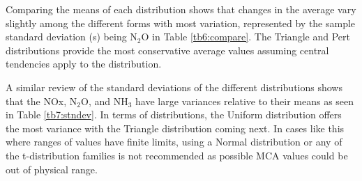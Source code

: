 %
Comparing the means of each distribution shows that changes in the average vary slightly among the different forms with most variation, represented by the sample standard deviation (s) being N$_{2}$O in Table \ref{tb6:compare}.  The Triangle and Pert distributions provide the most conservative average values assuming central tendencies apply to the distribution.
%
\begin{table}[H]
\centering
\caption{Comparison of annual total emission means}
\label{tb6:compare}
\end{table}
%
A similar review of the standard deviations of the different distributions shows that the NOx, N$_{2}$O, and NH$_{3}$ have large variances relative to their means as seen in Table \ref{tb7:stndev}.  In terms of distributions, the Uniform distribution offers the most variance with the Triangle distribution coming next. In cases like this where ranges of values have finite limits, using a Normal distribution or any of the t-distribution families is not recommended as possible MCA values could be out of physical range.
